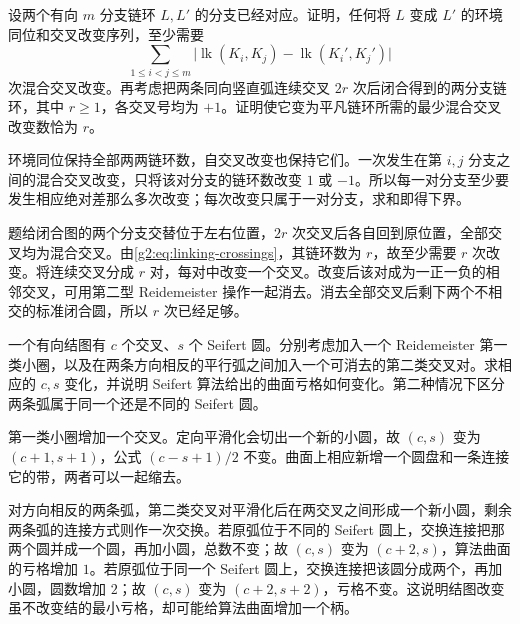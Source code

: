 \begin{exercise}\label{g2:ex:linking-crossing-bound}
	设两个有向 \(m\) 分支链环 \(L,L'\) 的分支已经对应。证明，任何将 \(L\) 变成 \(L'\) 的环境同位和交叉改变序列，至少需要
	\[
		\sum_{1\leq i<j\leq m}
		\bigl|\operatorname{lk}(K_i,K_j)-\operatorname{lk}(K_i',K_j')\bigr|
	\]
	次混合交叉改变。再考虑把两条同向竖直弧连续交叉 \(2r\) 次后闭合得到的两分支链环，其中 \(r\geq1\)，各交叉号均为 \(+1\)。证明使它变为平凡链环所需的最少混合交叉改变数恰为 \(r\)。
\end{exercise}
\begin{solution}
	环境同位保持全部两两链环数，自交叉改变也保持它们。一次发生在第 \(i,j\) 分支之间的混合交叉改变，只将该对分支的链环数改变 \(1\) 或 \(-1\)。所以每一对分支至少要发生相应绝对差那么多次改变；每次改变只属于一对分支，求和即得下界。

	题给闭合图的两个分支交替位于左右位置，\(2r\) 次交叉后各自回到原位置，全部交叉均为混合交叉。由\eqref{g2:eq:linking-crossings}，其链环数为 \(r\)，故至少需要 \(r\) 次改变。将连续交叉分成 \(r\) 对，每对中改变一个交叉。改变后该对成为一正一负的相邻交叉，可用第二型 Reidemeister 操作一起消去。消去全部交叉后剩下两个不相交的标准闭合圆，所以 \(r\) 次已经足够。
\end{solution}

\begin{exercise}\label{g2:ex:seifert-stabilized-diagram}
	一个有向结图有 \(c\) 个交叉、\(s\) 个 Seifert 圆。分别考虑加入一个 Reidemeister 第一类小圈，以及在两条方向相反的平行弧之间加入一个可消去的第二类交叉对。求相应的 \(c,s\) 变化，并说明 Seifert 算法给出的曲面亏格如何变化。第二种情况下区分两条弧属于同一个还是不同的 Seifert 圆。
\end{exercise}
\begin{solution}
	第一类小圈增加一个交叉。定向平滑化会切出一个新的小圆，故 \((c,s)\) 变为 \((c+1,s+1)\)，公式 \((c-s+1)/2\) 不变。曲面上相应新增一个圆盘和一条连接它的带，两者可以一起缩去。

	对方向相反的两条弧，第二类交叉对平滑化后在两交叉之间形成一个新小圆，剩余两条弧的连接方式则作一次交换。若原弧位于不同的 Seifert 圆上，交换连接把那两个圆并成一个圆，再加小圆，总数不变；故 \((c,s)\) 变为 \((c+2,s)\)，算法曲面的亏格增加 \(1\)。若原弧位于同一个 Seifert 圆上，交换连接把该圆分成两个，再加小圆，圆数增加 \(2\)；故 \((c,s)\) 变为 \((c+2,s+2)\)，亏格不变。这说明结图改变虽不改变结的最小亏格，却可能给算法曲面增加一个柄。
\end{solution}

